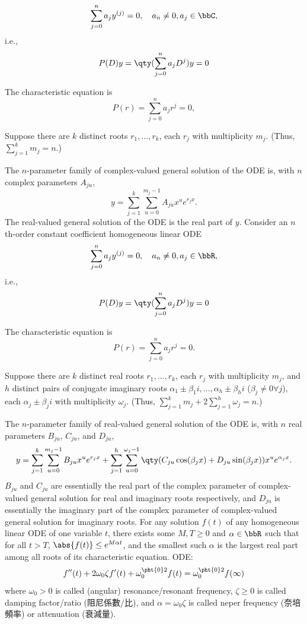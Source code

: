 \documentclass[a4paper,12pt]{report}
\begin{document}
\[\sum_{j=0}^na_jy^{(j)}=0,\quad a_n\neq 0,a_j\in\bbC,\]
i.e.,
\[P(D)y=\qty(\sum_{j=0}^na_jD^j)y=0\]
\ben
\item The characteristic equation is
\[P(r)=\sum_{j=0}^na_jr^j=0,\]
\item Suppose there are $k$ distinct roots $r_1,\ldots,r_k$, each $r_j$ with multiplicity $m_j$. (Thus, $\sum_{j=1}^km_j=n$.)
\item The $n$-parameter family of complex-valued general solution of the ODE is, with $n$ complex parameters $A_{ju}$,
\[y=\sum_{j=1}^k\sum_{u=0}^{m_j-1}A_{ju}x^ue^{r_jx}.\]
The real-valued general solution of the ODE is the real part of $y$.
\een
{}
Consider an $n$th-order constant coefficient homogeneous linear ODE
\[\sum_{j=0}^na_jy^{(j)}=0,\quad a_n\neq 0,a_j\in\bbR,\]
i.e.,
\[P(D)y=\qty(\sum_{j=0}^na_jD^j)y=0\]
\ben
\item The characteristic equation is
\[P(r)=\sum_{j=0}^na_jr^j=0.\]
\item Suppose there are $k$ distinct real roots $r_1,\ldots,r_k$, each $r_j$ with multiplicity $m_j$, and $h$ distinct pairs of conjugate imaginary roots $\alpha_1\pm\beta_1i,\ldots,\alpha_h\pm\beta_hi$ ($\beta_j\neq 0\forall j$), each $\alpha_j\pm\beta_ji$ with multiplicity $\omega_j$. (Thus, $\sum_{j=1}^km_j+2\sum_{j=1}^h\omega_j=n$.)
\item The $n$-parameter family of real-valued general solution of the ODE is, with $n$ real parameters $B_{ju}$, $C_{ju}$, and $D_{ju}$,
\[y=\sum_{j=1}^k\sum_{u=0}^{m_j-1}B_{ju}x^ue^{r_jx}+\sum_{j=1}^h\sum_{u=0}^{\omega_j-1}\qty(C_{ju}\cos(\beta_jx)+D_{ju}\sin(\beta_jx))x^ue^{\alpha_jx}.\]
$B_{ju}$ and $C_{ju}$ are essentially the real part of the complex parameter of complex-valued general solution for real and imaginary roots respectively, and $D_{ju}$ is essentially the imaginary part of the complex parameter of complex-valued general solution for imaginary roots.
\een
{}
For any solution $f(t)$ of any homogeneous linear ODE of one variable $t$, there exists some $M,T\geq 0$ and $\alpha\in\bbR$ such that for all $t>T$, $\abs{f(t)}\leq e^{M\alpha t}$, and the smallest such $\alpha$ is the largest real part among all roots of its characteristic equation.
ODE:
\[f''(t)+2\omega_0\zeta f'(t)+\omega_0^{\pht{0}2}f(t)=\omega_0^{\pht{0}2}f(\infty)\]
where $\omega_0>0$ is called (angular) resonance/resonant frequency, $\zeta\ge0$ is called damping factor/ratio (阻尼係數/比), and $\alpha=\omega_0\zeta$ is called neper frequency (奈培頻率) or attenuation (衰減量).
\end{document}
